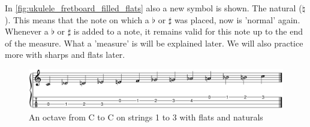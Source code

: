 In \autoref{fig:ukulele_fretboard_filled_flats} also a new symbol is shown. The natural ($\natural$). This means that the note on which a $\flat$ or $\sharp$ was placed, now is 'normal' again. Whenever a $\flat$ or $\sharp$ is added to a note, it remains valid for this note up to the end of the measure. What a 'measure' is will be explained later. We will also practice more with sharps and flats later.

\begin{figure}[h]
    \centering
    \includegraphics[width=\textwidth]{../../MuseScore/Ukulele/UkuleleChromaticNotesFlatsMultiString.png}
    \caption{An octave from C to C on strings 1 to 3 with flats and naturals}
    \label{fig:ukulele_fretboard_filled_flats}
\end{figure}